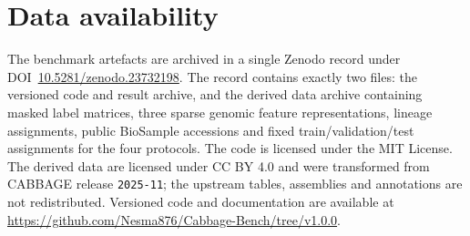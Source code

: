 \section*{Data availability}

The benchmark artefacts are archived in a single Zenodo record
under DOI~\href{https://doi.org/10.5281/zenodo.23732198}{10.5281/zenodo.23732198}. The record contains exactly two files: the
versioned code and result archive, and the derived data archive containing
masked label matrices, three sparse genomic feature representations, lineage
assignments, public BioSample accessions and fixed train/validation/test
assignments for the four protocols. The code is licensed under the MIT
License. The derived data are licensed under CC BY 4.0 and were transformed
from CABBAGE release \texttt{2025-11}; the upstream tables, assemblies and
annotations are not redistributed. Versioned code and documentation are
available at \url{https://github.com/Nesma876/Cabbage-Bench/tree/v1.0.0}.

